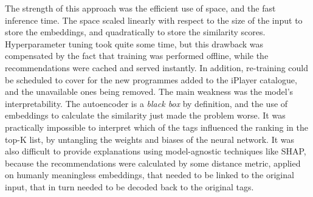 The strength of this approach was the efficient use of space, and the fast inference time.
The space scaled linearly with respect to the size of the input to store the embeddings,
and quadratically to store the similarity scores.
Hyperparameter tuning took quite some time, but this drawback was compensated by the fact that training was performed offline,
while the recommendations were cached and served instantly. In addition, re-training could be scheduled to cover for the new
programmes added to the iPlayer catalogue, and the unavailable ones being removed.
The main weakness was the model's interpretability.
The autoencoder is a \textit{black box} by definition, and the
use of embeddings to calculate the similarity just made the problem worse.
It was practically impossible to interpret which of the tags influenced
the ranking in the top-K list, by untangling the weights and biases of the neural network.
It was also difficult to provide explanations using model-agnostic techniques like SHAP,
because the recommendations were calculated by some distance metric, applied on
humanly meaningless embeddings, that needed to be linked to the original input, that in turn needed to be
decoded back to the original tags.
